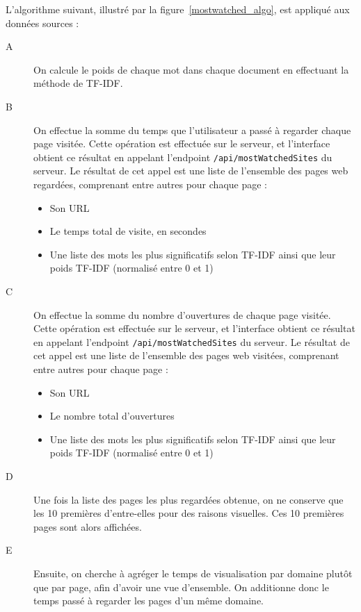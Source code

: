 			L'algorithme suivant, illustré par la figure~\ref{mostwatched_algo}, est appliqué aux données sources :
			\begin{description}
				\item[A] On calcule le poids de chaque mot dans chaque document en effectuant la méthode de TF-IDF.

				\item[B] On effectue la somme du temps que l'utilisateur a passé à regarder chaque page visitée. Cette opération est effectuée sur le serveur, et l'interface obtient ce résultat en appelant l'endpoint \texttt{/api/mostWatchedSites} du serveur. Le résultat de cet appel est une liste de l'ensemble des pages web regardées, comprenant entre autres pour chaque page : 
				\begin{itemize}
					\item Son URL
					\item Le temps total de visite, en secondes
					\item Une liste des mots les plus significatifs selon TF-IDF ainsi que leur poids TF-IDF (normalisé entre 0 et 1)
				\end{itemize}

				\item[C] On effectue la somme du nombre d'ouvertures de chaque page visitée. Cette opération est effectuée sur le serveur, et l'interface obtient ce résultat en appelant l'endpoint \texttt{/api/mostWatchedSites} du serveur. Le résultat de cet appel est une liste de l'ensemble des pages web visitées, comprenant entre autres pour chaque page : 
				\begin{itemize}
					\item Son URL
					\item Le nombre total d'ouvertures
					\item Une liste des mots les plus significatifs selon TF-IDF ainsi que leur poids TF-IDF (normalisé entre 0 et 1)
				\end{itemize}
				
				\item[D] Une fois la liste des pages les plus regardées obtenue, on ne conserve que les 10 premières d'entre-elles pour des raisons visuelles. Ces 10 premières pages sont alors affichées.

				\item[E] Ensuite, on cherche à agréger le temps de visualisation par domaine plutôt que par page, afin d'avoir une vue d'ensemble. On additionne donc le temps passé à regarder les pages d'un même domaine.


\end{description}
